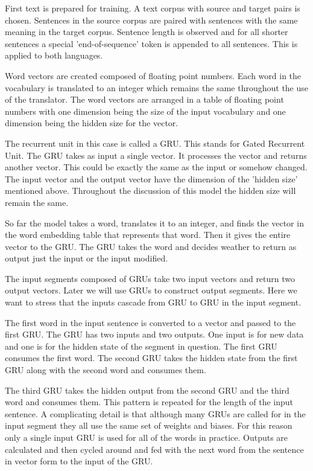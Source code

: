 First text is prepared for training. A text corpus with source and target pairs is chosen. Sentences in the source corpus are paired with sentences with the same meaning in the target corpus. Sentence length is observed and for all shorter sentences a special 'end-of-sequence' token is appended to all sentences. This is applied to both languages.

Word vectors are created composed of floating point numbers. Each word in the vocabulary is translated to an integer which remains the same throughout the use of the translator. The word vectors are arranged in a table of floating point numbers with one dimension being the size of the input vocabulary and one dimension being the hidden size for the vector.

The recurrent unit in this case is called a GRU. This stands for Gated Recurrent Unit. The GRU takes as input a single vector. It processes the vector and returns another vector. This could be
exactly the same as the input or somehow changed. The input vector and the output vector have the
dimension of the 'hidden size' mentioned above. Throughout the discussion of this model the hidden size will remain the same.

So far the model takes a word, translates it to an integer, and finds the vector in the word embedding table that represents that word. Then it gives the entire vector to the GRU. The GRU takes the word and decides weather to return as output just the input or the input modified.

The input segments composed of GRUs take two input vectors and return two output vectors. Later we will use GRUs to construct output segments. Here we want to stress that the inputs cascade from GRU to GRU in the input segment. 

The first word in the input sentence is converted to a vector and passed to the first GRU. The GRU has two inputs and two outputs. One input is for new data and one is for the hidden state of the segment in question. The first GRU consumes the first word. The second GRU takes the hidden state from the first GRU along with the second word and consumes them.

The third GRU takes the hidden output from the second GRU and the third word and consumes them. This pattern is repeated for the length of the input sentence. A complicating detail is that although many GRUs are called for in the input segment they all use the same set of weights and 
biases. For this reason only a single input GRU is used for all of the words in practice. Outputs are calculated and then cycled around and fed with the next word from the sentence in vector form to the input of the GRU. 

